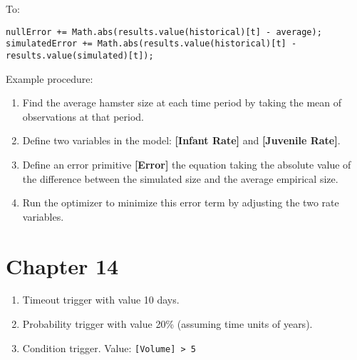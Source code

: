 \documentclass[]{memoir}
\newcommand{\p}[1]{\textbf{{[}#1{]}}}
\begin{document}
To:

\begin{lstlisting}
nullError += Math.abs(results.value(historical)[t] - average);
simulatedError += Math.abs(results.value(historical)[t] - results.value(simulated)[t]);
\end{lstlisting}


Example procedure:

\begin{enumerate}
\def\labelenumi{\arabic{enumi}.}
\itemsep1pt\parskip0pt
\item
  Find the average hamster size at each time period by taking the mean
  of observations at that period.
\item
  Define two variables in the model: \p{Infant Rate} and
  \p{Juvenile Rate}.
\item
  Define an error primitive \p{Error} the equation taking the absolute
  value of the difference between the simulated size and the average
  empirical size.
\item
  Run the optimizer to minimize this error term by adjusting the two
  rate variables.
\end{enumerate}

\section{Chapter 14}


\begin{enumerate}
\def\labelenumi{\arabic{enumi}.}
\itemsep1pt\parskip0pt
\item
  Timeout trigger with value 10 days.
\item
  Probability trigger with value 20\% (assuming time units of years).
\item
  Condition trigger. Value: \lstinline![Volume] > 5!
\end{enumerate}

\end{document}
